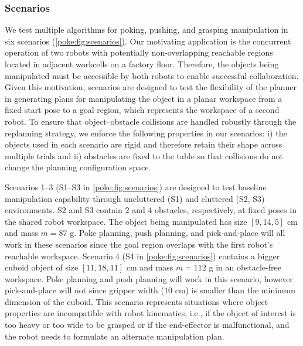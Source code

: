 \subsubsection{Scenarios}
\label{poke:sec:evaluation-scenarios}

We test multiple algorithms for poking, pushing, and grasping manipulation in six scenarios (\cref{poke:fig:scenarios}).
Our motivating application is the concurrent operation of two robots with potentially non-overlapping reachable regions located in adjacent workcells on a factory floor. Therefore, the objects being manipulated must be accessible by both robots to enable successful collaboration.
Given this motivation, scenarios are designed to test the flexibility of the planner in generating plans for manipulating the object in a planar workspace from a fixed start pose to a goal region, which represents the workspace of a second robot. To ensure that object--obstacle collisions are handled robustly through the replanning strategy, we enforce the following properties in our scenarios: i) the objects used in each scenario are rigid and therefore retain their shape across multiple trials and ii) obstacles are fixed to the table so that collisions do not change the planning configuration space.

Scenarios 1--3 (S1--S3 in \cref{poke:fig:scenarios}) are designed to test baseline manipulation capability through uncluttered (S1) and cluttered (S2, S3) environments. S2 and S3 contain 2 and 4 obstacles, respectively, at fixed poses in the shared robot workspace. The object being manipulated has size $[9, 14, 5]$ cm and mass $m=87$ g. Poke planning, push planning, and pick-and-place will all work in these scenarios since the goal region overlaps with the first robot's reachable workspace.
Scenario 4 (S4 in \cref{poke:fig:scenarios}) contains a bigger cuboid object of size $[11, 18, 11]$ cm and mass $m=112$ g in an obstacle-free workspace. Poke planning and push planning will work in this scenario, however pick-and-place will not since gripper width ($10$ cm) is smaller than the minimum dimension of the cuboid. This scenario represents situations where object properties are incompatible with robot kinematics, i.e., if the object of interest is too heavy or too wide to be grasped or if the end-effector is malfunctional, and the robot needs to formulate an alternate manipulation plan.

